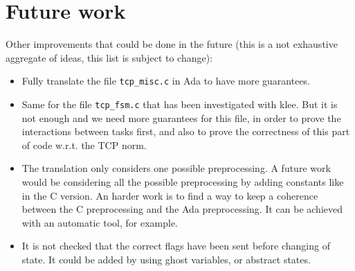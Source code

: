 \documentclass[a4paper, 10pt]{article}
\begin{document}
    


    \section{Future work}

    Other improvements that could be done in the future (this is a not exhaustive aggregate of ideas,
    this list is subject to change):
    \begin{itemize}
        \item Fully translate the file \texttt{tcp\_misc.c} in Ada to have more guarantees.
        \item Same for the file \texttt{tcp\_fsm.c} that has been investigated with klee. But
        it is not enough and we need more guarantees for this file, in order to prove the
        interactions between tasks first, and also to prove the correctness of this part
        of code w.r.t. the TCP norm.
        \item The translation only considers one possible preprocessing. A future work would
        be considering all the possible preprocessing by adding constants like in the C
        version. An harder work is to find a way to keep a coherence between the C preprocessing
        and the Ada preprocessing. It can be achieved with an automatic tool, for example.

        \item It is not checked that the correct flags have been sent before changing of state.
        It could be added by using ghost variables, or abstract states.
    \end{itemize}

    \printbibliography
    
\end{document}
